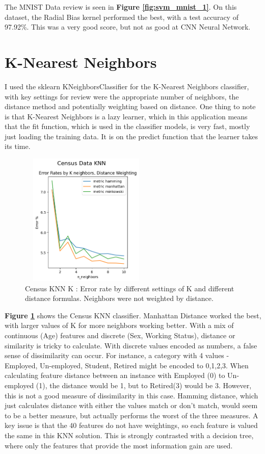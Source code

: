 \documentclass[letterpaper]{article} %
\begin{document}
The MNIST Data review is seen in \textbf{Figure \ref{fig:svm_mnist_1}}.  On this dataset, the Radial Bias kernel performed the best,  with a test accuracy of 97.92\%.  This was a very good score, but not as good at CNN Neural Network.

\section{K-Nearest Neighbors}
I used the sklearn KNeighborsClassifier for the K-Nearest Neighbors classifier, with key settings for review were the appropriate number of neighbors, the distance method and potentially weighting based on distance.  One thing to note is that K-Nearest Neighbors is a lazy learner, which in this application means that the fit function, which is used in the classifier models, is very fast, mostly just loading the training data.  It is on the predict function that the learner takes its time.

\begin{figure}[h]
\centering
\includegraphics[width=2.5in, height=2.5in]{figures/Census_Data_KNN_knn_1.png}
\caption{Census KNN K :  Error rate by different settings of K and different distance formulas.  Neighbors were not weighted by distance.  }
\label{fig:census_knn_1}
\end{figure}

\textbf{Figure \ref{fig:census_knn_1}} shows the Census KNN classifier.  Manhattan Distance worked the best, with larger values of K for more neighbors working better.  With a mix of continuous (Age) features and discrete (Sex, Working Status), distance or similarity is tricky to calculate.  With discrete values encoded as numbers, a false sense of dissimilarity can occur.  For instance, a category with 4 values - Employed, Un-employed, Student, Retired might be encoded to 0,1,2,3.  When calculating feature distance between an instance with Employed (0) to Un-employed (1), the distance would be 1, but to Retired(3) would be 3.  However, this is not a good measure of dissimilarity in this case.  Hamming distance, which just calculates distance with either the values match or don't match, would seem to be a better measure, but actually performs the worst of the three measures.  A key issue is that the 40 features do not have weightings, so each feature is valued the same in this KNN solution.  This is strongly contrasted with a decision tree, where only the features that provide the most information gain are used.
\end{document}

